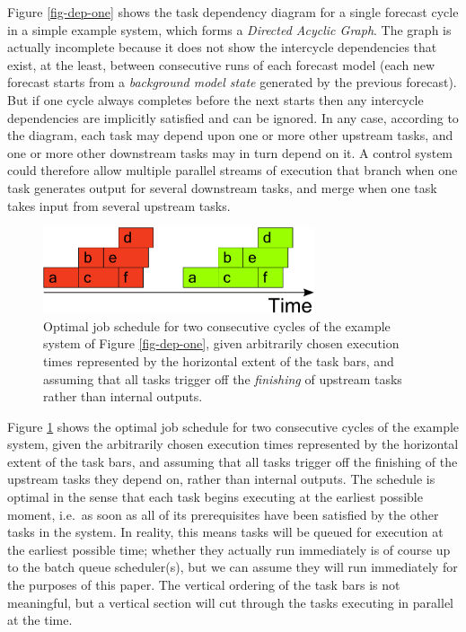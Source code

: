 \documentclass[11pt,a4paper]{article}
\begin{document}
Figure \ref{fig-dep-one} shows the task dependency diagram for a single
forecast cycle in a simple example system, which forms a {\em Directed
Acyclic Graph}. The graph is actually incomplete because it does not
show the intercycle dependencies that exist, at the least, between
consecutive runs of each forecast model (each new forecast starts from a
{\em background model state} generated by the previous forecast). But
if one cycle always completes before the next starts then any intercycle
dependencies are implicitly satisfied and can be ignored. In any
case, according to the diagram, each task may depend upon one or more
other upstream tasks, and one or more other downstream tasks may in turn
depend on it. A control system could therefore allow multiple parallel
streams of execution that branch when one task generates output for
several downstream tasks, and merge when one task takes input from
several upstream tasks. 
\begin{figure}
    \begin{center}
        \includegraphics[width=8cm]{timeline-one}
    \end{center}
    \caption{\small Optimal job schedule for two consecutive cycles of
    the example system of Figure \ref{fig-dep-one}, given arbitrarily
    chosen execution times represented by the horizontal extent of the
    task bars, and assuming that all tasks trigger off the {\em
    finishing} of upstream tasks rather than internal outputs.}
    \label{fig-time-one}
\end{figure}

Figure \ref{fig-time-one} shows the optimal job schedule for two
consecutive cycles of the example system, given the arbitrarily chosen
execution times represented by the horizontal extent of the task bars,
and assuming that all tasks trigger off the finishing of the upstream
tasks they depend on, rather than internal outputs.  The schedule is
optimal in the sense that each task begins executing at the earliest
possible moment, i.e.\ as soon as all of its prerequisites have been
satisfied by the other tasks in the system. In reality, this means tasks
will be queued for execution at the earliest possible time; whether they
actually run immediately is of course up to the batch queue
scheduler(s), but we can assume they will run immediately for the
purposes of this paper.  The vertical ordering of the task bars is not
meaningful, but a vertical section will cut through the tasks executing
in parallel at the time.
\end{document}
